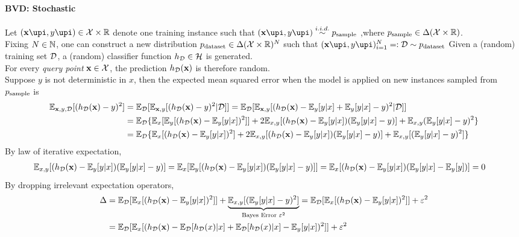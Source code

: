 \documentclass[4pt]{article}
\begin{document}
	\paragraph{BVD: Stochastic}Let $(\vex\upi, y\upi) \in \mc{X} \times \R$ denote one training instance such that
	$
		(\vex\upi, y\upi) \overset{i.i.d.}{\sim} p_{\tx{sample}}
	$
	,where $p_{\text{{sample}}} \in \Delta (\mathcal{{X}} \times \mathbb{R})$. \\
	Fixing $N \in \mathbb{N}$, one can construct a new distribution $p_{\text{{dataset}}} \in \Delta (\mathcal{{X}} \times \mathbb{R})^N$ such that 
	$
		(\vex\upi, y\upi)_{i=1}^N =: \mc{D} \sim p_{\tx{dataset}}
	$
	Given a (random) training set $\mathcal{{D}}$, a (random) classifier function $h_{\mathcal{{D}}} \in \mathcal{{H}}$ is generated. \\
	For every \emph{query point} $\textbf{x} \in \mathcal{{X}}$, the prediction $h_{\mathcal{{D}}}(\textbf{x})$ is therefore random. \\
	Suppose $y$ is not deterministic in $x$, then the expected mean squared error when the model is applied on new instances sampled from $p_{\text{{sample}}}$ is
	\begin{align}
		\mathbb{E}_{\textbf{x}, y, \mathcal{{D}}}[(h_{\mathcal{{D}}}(\textbf{x}) - y)^2] &= \mathbb{E}_{\mathcal{{D}}}[
		\mathbb{E}_{\textbf{x}, y} [(h_{\mathcal{{D}}}(\textbf{x}) - y)^2|\mathcal{{D}}]
		]
		= \mathbb{E}_{\mathcal{{D}}}[
		\mathbb{E}_{\textbf{x}, y} [(h_{\mathcal{{D}}}(\textbf{x}) - \mathbb{E}_y[y|x] + \mathbb{E}_y[y|x] - y)^2|\mathcal{{D}}]
		]\\ 
		&= \mathbb{E}_{\mathcal{{D}}} \{
		\mathbb{E}_x[
		\mathbb{E}_y[
		(h_{\mathcal{{D}}}(\textbf{x}) - \mathbb{E}_y[y|x])^2
		]
		]
		+ 2 \mathbb{E}_{x,y}[(h_{\mathcal{{D}}}(\textbf{x}) - \mathbb{E}_y[y|x]) (\mathbb{E}_y[y|x] - y)] 
		+ \mathbb{E}_{x, y} (\mathbb{E}_y[y|x] - y)^2
		\}\\
		&= \mathbb{E}_{\mathcal{{D}}} \{
		\mathbb{E}_x[
		(h_{\mathcal{{D}}}(\textbf{x}) - \mathbb{E}_y[y|x])^2
		]
		+ 2 \mathbb{E}_{x,y}[(h_{\mathcal{{D}}}(\textbf{x}) - \mathbb{E}_y[y|x]) (\mathbb{E}_y[y|x] - y)] 
		+ \mathbb{E}_{x, y} [(\mathbb{E}_y[y|x] - y)^2]
		\} \\
	\end{align}
	By law of iterative expectation,
	\begin{align}
		\mathbb{E}_{x,y}[(h_{\mathcal{{D}}}(\textbf{x}) - \mathbb{E}_y[y|x]) (\mathbb{E}_y[y|x] - y)] &= \mathbb{E}_x [
		\mathbb{E}_y[
		(h_{\mathcal{{D}}}(\textbf{x}) - \mathbb{E}_y[y|x]) (\mathbb{E}_y[y|x] - y)
		]]
		= \mathbb{E}_x[
		(h_{\mathcal{{D}}}(\textbf{x}) - \mathbb{E}_y[y|x]) (\mathbb{E}_y[y|x] - \mathbb{E}_y[y])
		]
		= 0
	\end{align}
	By dropping irrelevant expectation operators, 
	\begin{align}
		\Delta &= \mathbb{E}_{\mathcal{{D}}}[\mathbb{E}_x[(h_{\mathcal{{D}}}(\textbf{x}) - \mathbb{E}_y[y|x])^2]] + \underbrace{\mathbb{E}_{x, y}[(\mathbb{E}_y[y|x] - y)^2]}_{\text{{Bayes Error }} \varepsilon^2}
		= \mathbb{E}_{\mathcal{{D}}}[\mathbb{E}_x[
		(h_{\mathcal{{D}}}(\textbf{x}) - \mathbb{E}_y[y|x])^2
		]] + \varepsilon^2 \\
		&= \mathbb{E}_{\mathcal{{D}}}[\mathbb{E}_x[
		(h_{\mathcal{{D}}}(\textbf{x}) - \mathbb{E}_{\mathcal{{D}}}[h_{\mathcal{{D}}}(x)|x] + \mathbb{E}_{\mathcal{{D}}}[h_{\mathcal{{D}}}(x)|x] -  \mathbb{E}_y[y|x])^2
		]] + \varepsilon^2
	\end{align}
\end{document}
